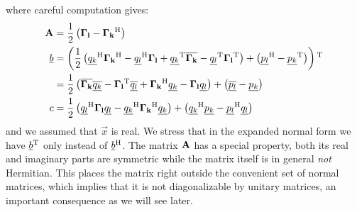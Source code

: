 \documentclass[a4paper,10pt]{article}
\begin{document}
where careful computation gives:
\begin{equation}\label{eq:combined_oscillators}
\begin{split}
  \mathbf{A} & = \frac{1}{2} \left(\mathbf{\Gamma_l} - \mathbf{\Gamma_k}{}^{\textnormal{H}} \right) \\
  \underline{b} & = \left(\frac{1}{2} \left(
                                  \underline{q_k}{}^{\textnormal{H}} \mathbf{\Gamma_k}{}^{\textnormal{H}}
                                 -\underline{q_l}{}^{\textnormal{H}} \mathbf{\Gamma_l}
                                 +\underline{q_k}{}^{\textnormal{T}} \overline{\mathbf{\Gamma_k}}
                                 -\underline{q_l}{}^{\textnormal{T}} \mathbf{\Gamma_l}{}^{\textnormal{T}}
                                \right)
                + \left(\underline{p_l}{}^{\textnormal{H}} - \underline{p_k}{}^{\textnormal{T}}\right)
              \right){}^{\textnormal{T}} \\
          & = \frac{1}{2} \left(
                            \overline{\mathbf{\Gamma_k}} \overline{\underline{q_k}}
                           -\mathbf{\Gamma_l}{}^{\textnormal{T}} \overline{\underline{q_l}}
                           +\mathbf{\Gamma_k}{}^{\textnormal{H}} \underline{q_k}
                           -\mathbf{\Gamma_l} \underline{q_l}
                          \right)
              + \left(\overline{\underline{p_l}} - \underline{p_k}\right) \\
  c & = \frac{1}{2} \left(
                      \underline{q_l}{}^{\textnormal{H}} \mathbf{\Gamma_l} \underline{q_l}
                     -\underline{q_k}{}^{\textnormal{H}} \mathbf{\Gamma_k}{}^{\textnormal{H}} \underline{q_k}
                    \right)
        + \left(\underline{q_k}{}^{\textnormal{H}} \underline{p_k} - \underline{p_l}{}^{\textnormal{H}} \underline{q_l}\right)
\end{split}
\end{equation}
and we assumed that $\vec{x}$ is real. We stress that in the
expanded normal form we have $\underline{b}{}^{\textnormal{T}}$ only instead of $\underline{b}{}^{\textnormal{H}}$.
The matrix $\mathbf{A}$ has a special property, both its real and
imaginary parts are symmetric while the matrix itself is in general
\emph{not} Hermitian. This places the matrix right outside the convenient
set of normal matrices, which implies that it is not diagonalizable
by unitary matrices, an important consequence as we will see later.
\end{document}

